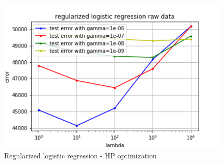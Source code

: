 \documentclass[11pt, a4paper, twoside]{article}
\begin{document}
\begin{figure}[h!]
  \includegraphics[width=\linewidth]{plots/raw_data_reg_log_regr.png}
  \caption{Regularized logistic regression - HP optimization}
  \label{fig:raw_reg_log_regr}
\end{figure}
\end{document}
